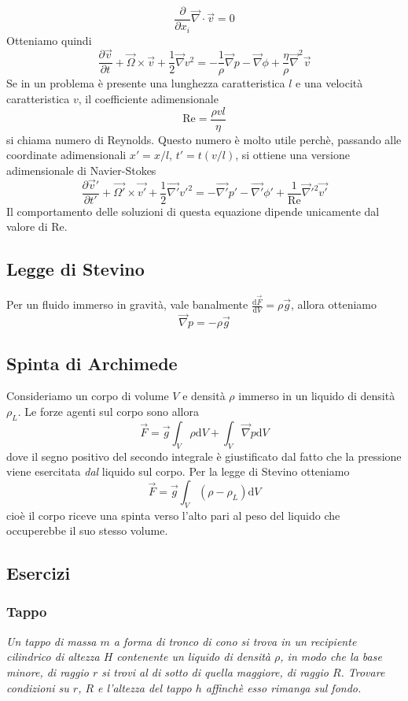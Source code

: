 \documentclass[a4paper,11pt]{article}
\begin{document}
\[\frac{\partial}{\partial x_i}\vec{\nabla}\cdot\vec{v}=0\]
Otteniamo quindi
\[\frac{\partial\vec v}{\partial t}+\vec{\Omega}\times\vec{v}+\frac{1}{2}\vec{\nabla}v^2=-\frac{1}{\rho}\vec{\nabla}p-\vec{\nabla}\phi+\frac{\eta}{\rho}\vec\nabla^2\vec{v}\]
Se in un problema è presente una lunghezza caratteristica $l$ e una velocità caratteristica $v$, il coefficiente adimensionale
\[\textrm{Re}=\frac{\rho v l}{\eta}\]
si chiama numero di Reynolds. Questo numero è molto utile perchè, passando alle coordinate adimensionali $x'=x/l$, $t'=t(v/l)$, si ottiene una versione adimensionale di Navier-Stokes
\[\frac{\partial\vec v'}{\partial t'}+\vec{\Omega'}\times\vec{v'}+\frac{1}{2}\vec{\nabla'}v'^2=-\vec{\nabla'}p'-\vec{\nabla'}\phi'+\frac{1}{\textrm{Re}}\vec\nabla'^2\vec{v'}\]
Il comportamento delle soluzioni di questa equazione dipende unicamente dal valore di Re.
\subsection{Legge di Stevino}
Per un fluido immerso in gravità, vale banalmente $\frac{\mathrm{d}\vec{F}}{\mathrm{d}V}=\rho\vec{g}$, allora otteniamo
\[\vec\nabla p=-\rho\vec{g}\]

\subsection{Spinta di Archimede}
Consideriamo un corpo di volume $V$ e densità $\rho$ immerso in un liquido di densità $\rho_L$. Le forze agenti sul corpo sono allora
\[\vec F=\vec g\int_{V}\rho\mathrm{d}V+\int_{V}\vec{\nabla}p\mathrm{d}V\]
dove il segno positivo del secondo integrale è giustificato dal fatto che la pressione viene esercitata \textit{dal} liquido sul corpo. Per la legge di Stevino otteniamo
\[\vec F=\vec g\int_{V}(\rho-\rho_L)\mathrm{d}V\]
cioè il corpo riceve una spinta verso l'alto pari al peso del liquido che occuperebbe il suo stesso volume.

\subsection{Esercizi}
\subsubsection{Tappo}
\textit{Un tappo di massa $m$ a forma di tronco di cono si trova in un recipiente cilindrico di altezza $H$ contenente un liquido di densità $\rho$, in modo che la base minore, di raggio $r$ si trovi al di sotto di quella maggiore, di raggio $R$. Trovare condizioni su $r$, $R$ e l'altezza del tappo $h$ affinchè esso rimanga sul fondo.}
\vspace{5mm}
\end{document}
